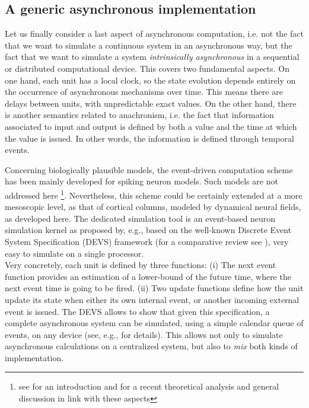 \subsection{A generic asynchronous implementation}

Let us finally consider a last aspect of asynchronous computation, i.e. not the fact that we want to simulate a continuous system in an asynchronous way, but the fact that we want to simulate a system {\em intrinsically asynchronous} in a sequential or distributed computational device.  This covers two fundamental aspects.  On one hand, each unit has a local clock, so the state evolution depends entirely on the occurrence of asynchronous mechanisms over time.  This means there are delays between units, with unpredictable exact values.  On the other hand, there is another semantics related to anachronism, i.e. the fact that information associated to input and output is defined by both a value and the time at which the value is issued.  In other words, the information is defined through temporal events.

Concerning biologically plausible models, the event-driven computation scheme has been mainly developed for spiking neuron models.  Such models are not addressed here \footnote{see \cite{Gerstner:2002} for an introduction and \cite{Cessac:2008,Cessac:2010} for a recent theoretical analysis and general discussion in link with these aspects}. Nevertheless, this scheme could be certainly extended at a more mesoscopic level, as that of cortical columns, modeled by dynamical neural fields, as developed here. The dedicated simulation tool is an event-based neuron simulation kernel as proposed by, e.g., \cite{Rochel:2003} based on the well-known Discrete Event System Specification (DEVS) framework (for a comparative review see \cite{Brette:2007}), very easy to simulate on a single processor.\\

Very concretely, each unit is defined by three functions: (i) The next event function provides an estimation of a lower-bound of the future time, where the next event time is going to be fired. (ii) Two update functions define how the unit update its state when either its own internal event, or another incoming external event is issued. The DEVS allows to show that given this specification, a complete asynchronous system can be simulated, using a simple calendar queue of events, on any device (see, e.g., \cite{Cessac:2009} for details). This allows not only to simulate asynchronous calculations on a centralized system, but also to {\em mix} both kinds of implementation. 

